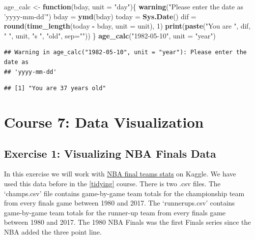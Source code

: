 \documentclass[]{book}
\newenvironment{Shaded}{\begin{snugshade}}{\end{snugshade}}
\newcommand{\ControlFlowTok}[1]{\textcolor[rgb]{0.13,0.29,0.53}{\textbf{#1}}}
\newcommand{\DataTypeTok}[1]{\textcolor[rgb]{0.13,0.29,0.53}{#1}}
\newcommand{\DecValTok}[1]{\textcolor[rgb]{0.00,0.00,0.81}{#1}}
\newcommand{\KeywordTok}[1]{\textcolor[rgb]{0.13,0.29,0.53}{\textbf{#1}}}
\newcommand{\NormalTok}[1]{#1}
\newcommand{\OperatorTok}[1]{\textcolor[rgb]{0.81,0.36,0.00}{\textbf{#1}}}
\newcommand{\StringTok}[1]{\textcolor[rgb]{0.31,0.60,0.02}{#1}}
\begin{document}
\begin{Shaded}
\begin{Highlighting}[]
\NormalTok{age_calc <-}\StringTok{ }\ControlFlowTok{function}\NormalTok{(bday, }\DataTypeTok{unit =} \StringTok{"day"}\NormalTok{)\{}
    \KeywordTok{warning}\NormalTok{(}\StringTok{"Please enter the date as 'yyyy-mm-dd'"}\NormalTok{)}
\NormalTok{    bday =}\StringTok{ }\KeywordTok{ymd}\NormalTok{(bday)}
\NormalTok{    today =}\StringTok{ }\KeywordTok{Sys.Date}\NormalTok{()}
\NormalTok{    dif =}\StringTok{ }\KeywordTok{round}\NormalTok{(}\KeywordTok{time_length}\NormalTok{(today }\OperatorTok{-}\StringTok{ }\NormalTok{bday, }\DataTypeTok{unit =}\NormalTok{ unit), }\DecValTok{1}\NormalTok{)}
    \KeywordTok{print}\NormalTok{(}\KeywordTok{paste}\NormalTok{(}\StringTok{"You are "}\NormalTok{, dif, }\StringTok{" "}\NormalTok{, unit, }\StringTok{"s "}\NormalTok{, }\StringTok{"old"}\NormalTok{, }\DataTypeTok{sep=}\StringTok{""}\NormalTok{))}
\NormalTok{\}}
\KeywordTok{age_calc}\NormalTok{(}\StringTok{"1982-05-10"}\NormalTok{, }\DataTypeTok{unit =} \StringTok{"year"}\NormalTok{)}
\end{Highlighting}
\end{Shaded}

\begin{verbatim}
## Warning in age_calc("1982-05-10", unit = "year"): Please enter the date as
## 'yyyy-mm-dd'
\end{verbatim}

\begin{verbatim}
## [1] "You are 37 years old"
\end{verbatim}

\hypertarget{visualization}{%
\chapter*{Course 7: Data Visualization}\label{visualization}}

\hypertarget{exercise-1-visualizing-nba-finals-data}{%
\section*{Exercise 1: Visualizing NBA Finals Data}\label{exercise-1-visualizing-nba-finals-data}}

In this exercise we will work with \href{https://www.kaggle.com/daverosenman/nba-finals-team-stats}{NBA final teams stats} on Kaggle. We have used this data before in the \ref{tidying} course. There is two .csv files. The `champs.csv' file contains game-by-game team totals for the championship team from every finals game between 1980 and 2017. The `runnerups.csv' contains game-by-game team totals for the runner-up team from every finals game between 1980 and 2017. The 1980 NBA Finals was the first Finals series since the NBA added the three point line.
\end{document}
